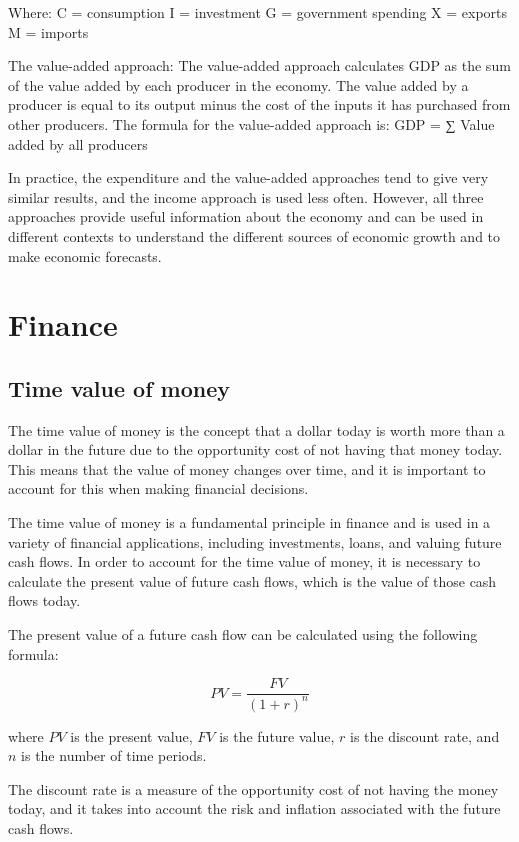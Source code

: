 \documentclass[12pt, a4paper, oneside]{article}
\begin{document}
Where:
C = consumption
I = investment
G = government spending
X = exports
M = imports

The value-added approach: The value-added approach calculates GDP as the sum of the value added by each producer in the economy. The value added by a producer is equal to its output minus the cost of the inputs it has purchased from other producers. The formula for the value-added approach is:
GDP = ∑ Value added by all producers

In practice, the expenditure and the value-added approaches tend to give very similar results, and the income approach is used less often. However, all three approaches provide useful information about the economy and can be used in different contexts to understand the different sources of economic growth and to make economic forecasts.





\section{Finance  }
\subsection{ Time value of money }
The time value of money is the concept that a dollar today is worth more than a dollar in the future due to the opportunity cost of not having that money today. This means that the value of money changes over time, and it is important to account for this when making financial decisions.

The time value of money is a fundamental principle in finance and is used in a variety of financial applications, including investments, loans, and valuing future cash flows. In order to account for the time value of money, it is necessary to calculate the present value of future cash flows, which is the value of those cash flows today.

The present value of a future cash flow can be calculated using the following formula:

$$PV = \frac{FV}{(1 + r)^n}$$

where $PV$ is the present value, $FV$ is the future value, $r$ is the discount rate, and $n$ is the number of time periods.

The discount rate is a measure of the opportunity cost of not having the money today, and it takes into account the risk and inflation associated with the future cash flows.
\end{document}
